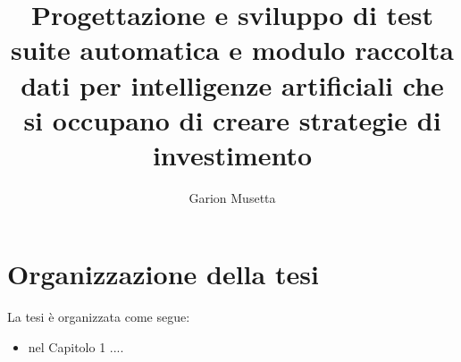 \documentclass[a4paper,12pt]{report}
\begin{document}
\title{Progettazione e sviluppo di test suite automatica e modulo raccolta dati per intelligenze artificiali che si occupano di creare strategie di investimento}
\author{Garion Musetta}
%
% 
%
\beforepreface
% 
%

%
%
\section*{Organizzazione della tesi}
\label{organizzazione}
La tesi \`e organizzata come segue:
\begin{itemize}
\item nel Capitolo 1 ....
\end{itemize}
%
%
\end{document}
